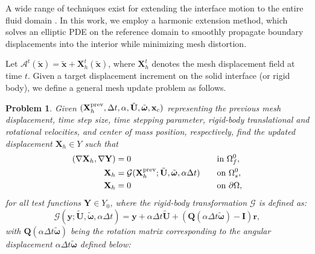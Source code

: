 \documentclass{article}
\newcommand\tU{{\tilde{\mathbf{U}}}}
\newcommand\tomega{{\tilde{\boldsymbol{\omega}}}}
\newtheorem{problem}{Problem}
\begin{document}
A wide range of techniques exist for extending the interface motion to the entire fluid domain \cite{jasak2006automatic,rangarajan2019algorithm,ramsharan2011analysis,barral2014two,sackinger1996newton,le2001fluid,cerroni2014new}. In this work, we employ a {harmonic extension} method, which solves an elliptic PDE on the reference domain to smoothly propagate boundary displacements into the interior while minimizing mesh distortion.

Let $\mathcal{A}^t(\tilde{\mathbf{x}}) = \tilde{\mathbf{x}} + \mathbf{X}_h^t(\tilde{\mathbf{x}})$, where $\mathbf{X}_h^t$ denotes the mesh displacement field at time $t$. Given a target displacement increment on the solid interface (or rigid body), we define a general mesh update problem as follows.

\begin{problem}\label{prob:mesh_update}
Given $(\mathbf{X}_h^{\rm prev}, \Delta t, \alpha, \tU, \tomega, \mathbf{x}_c)$ representing the previous mesh displacement, time step size, time stepping parameter, rigid-body translational and rotational velocities, and center of mass position, respectively, find the updated displacement $\mathbf{X}_h \in Y$ such that
\begin{equation}\label{eq:mesh_general}
    \begin{aligned}
    (\nabla \mathbf{X}_h, \nabla \mathbf{Y}) &= 0 
        &\quad &\text{in } \Omega_f^0, \\
    \mathbf{X}_h &= \mathcal{G}(\mathbf{X}_h^{\rm prev}; \tU, \tomega, \alpha\Delta t)
        &\quad &\text{on } \Omega_s^0, \\
    \mathbf{X}_h &= 0 
        &\quad &\text{on } \partial\Omega,
    \end{aligned}
\end{equation}
for all test functions $\mathbf{Y} \in Y_0$, where the rigid-body transformation $\mathcal{G}$ is defined as:
\[
\mathcal{G}(\mathbf{y}; \tU, \tomega, \alpha\Delta t) = \mathbf{y} + \alpha\Delta t\tU + (\mathbf{Q}(\alpha\Delta t\tomega)-\mathbf{I}) \mathbf{r},
\]
with $\mathbf{Q}(\alpha\Delta t\tomega)$ being the rotation matrix corresponding to the angular displacement $\alpha\Delta t\tomega$ defined below:
\begin{equation}\label{eq:rotation_matrix}

\end{equation}
\end{problem}
\end{document}
